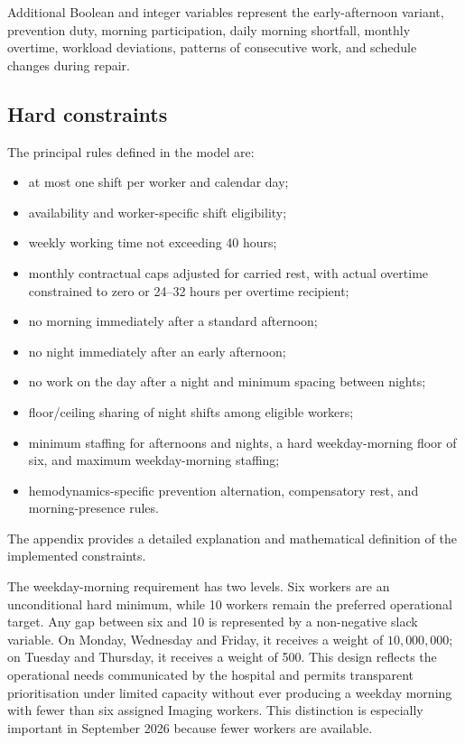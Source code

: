 \documentclass[11pt,a4paper]{article}
\begin{document}
Additional Boolean and integer variables represent the early-afternoon variant, prevention duty, morning participation, daily morning shortfall, monthly overtime, workload deviations, patterns of consecutive work, and schedule changes during repair.

\subsection{Hard constraints}

The principal rules defined in the model are:

\begin{itemize}
  \item at most one shift per worker and calendar day;
  \item availability and worker-specific shift eligibility;
  \item weekly working time not exceeding 40 hours;
  \item monthly contractual caps adjusted for carried rest, with actual overtime constrained to zero or 24--32 hours per overtime recipient;
  \item no morning immediately after a standard afternoon;
  \item no night immediately after an early afternoon;
  \item no work on the day after a night and minimum spacing between nights;
  \item floor/ceiling sharing of night shifts among eligible workers;
  \item minimum staffing for afternoons and nights, a hard weekday-morning floor of six, and maximum weekday-morning staffing;
  \item hemodynamics-specific prevention alternation, compensatory rest, and morning-presence rules.
\end{itemize}

The appendix provides a detailed explanation and mathematical definition of the implemented constraints.

The weekday-morning requirement has two levels. Six workers are an unconditional hard minimum, while 10 workers remain the preferred operational target. Any gap between six and 10 is represented by a non-negative slack variable. On Monday, Wednesday and Friday, it receives a weight of $10{,}000{,}000$; on Tuesday and Thursday, it receives a weight of 500. This design reflects the operational needs communicated by the hospital and permits transparent prioritisation under limited capacity without ever producing a weekday morning with fewer than six assigned Imaging workers. This distinction is especially important in September 2026 because fewer workers are available.
\end{document}
